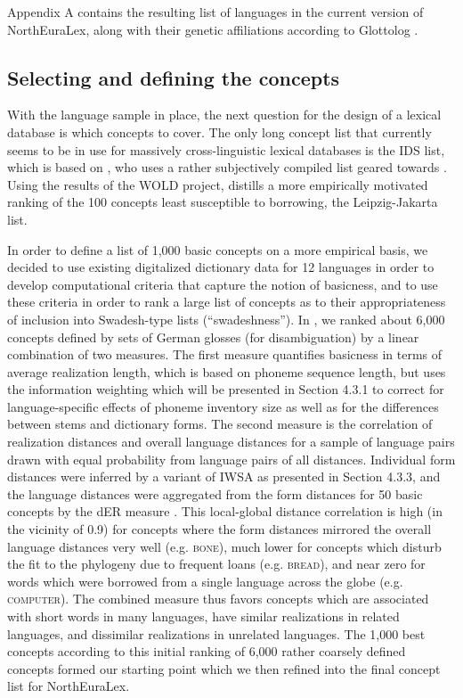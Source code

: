 Appendix A contains the resulting list of languages in the current version of NorthEuraLex,
along with their genetic affiliations according to Glottolog \citep{glottolog}.

\subsection{Selecting and defining the concepts}
With the language sample in place, the next question for the design of a lexical database is which concepts to cover. The only long concept list that currently seems to be in use for massively cross-linguistic lexical databases is the IDS list, which is based on \cite{buck1949}, who uses a rather subjectively compiled list geared towards . Using the results of the WOLD project, \cite{tadmor2009} distills a more empirically motivated ranking of the 100 concepts least susceptible to borrowing, the Leipzig-Jakarta list.

In order to define a list of 1,000 basic concepts on a more empirical basis, we decided to use existing digitalized dictionary data for 12 languages in order to develop computational criteria that capture the notion of basicness, and to use these criteria in order to rank a large list of concepts as to their appropriateness of inclusion into Swadesh-type lists (``swadeshness''). In \cite{dellert_buch_2015}, we ranked about 6,000 concepts defined by sets of German glosses (for disambiguation) by a linear combination of two measures. The first measure quantifies basicness in terms of average realization length, which is based on phoneme sequence length, but uses the information weighting which will be presented in Section 4.3.1 to correct for language-specific effects of phoneme inventory size as well as for the differences between stems and dictionary forms. The second measure is the correlation of realization distances and overall language distances for a sample of language pairs drawn with equal probability 
from language pairs of all distances. Individual form distances were inferred by a variant of IWSA as presented in Section 4.3.3, and the language distances were aggregated from the form distances for 50 basic concepts by the dER measure \citep{jaeger2013}. This local-global distance correlation is high (in the vicinity of 0.9) for concepts where the form distances mirrored the overall language distances very well (e.g. \textsc{bone}), much lower for concepts which disturb the fit to the phylogeny due to frequent loans (e.g. \textsc{bread}), and near zero for words which were borrowed from a single language across the globe (e.g. \textsc{computer}). The combined measure thus favors concepts which are associated with short words in many languages, have similar realizations in related languages, and dissimilar realizations in unrelated languages. The 1,000 best concepts according to this initial ranking of 6,000 rather coarsely defined concepts formed our starting point which we then refined into the final concept list for NorthEuraLex.

